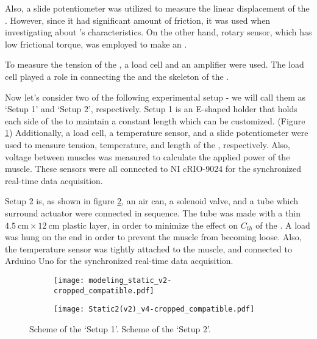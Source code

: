Also, a slide potentiometer was utilized to measure the linear displacement of the \scpsnospace. However, since it had significant amount of friction, it was used when investigating about \scpnospace's characteristics. On the other hand, rotary sensor, which has low frictional torque, was employed to make an \antanospace. 

To measure the tension of the \scpsnospace, a load cell and an amplifier were used.
The load cell played a role in connecting the \scps and the skeleton of the \antanospace.



Now let's consider two of the following experimental setup - we will call them as `Setup 1' and `Setup 2', respectively. Setup 1 is 
%
an E-shaped holder that holds each side of the \scp to maintain a constant length which can be customized. (Figure \ref{static_sch}) Additionally, a load cell, a temperature sensor, and a slide potentiometer were used to measure tension, temperature, and length of the \scpnospace, respectively. Also, voltage between muscles was measured to calculate the applied power of the muscle. These sensors were all connected to NI cRIO-9024 for the synchronized real-time data acquisition.

Setup 2 is, 
%
as shown in figure \ref{dynamic_sch}, an air can, a solenoid valve, and a tube which surround actuator were connected in sequence. 
The tube was made with a thin $\SI{4.5}{\centi\meter} \times \SI{12}{\centi\meter}$ plastic layer, in order to minimize the effect on $C_{th}$ of the \scpnospace.
A load was hung on the end in order to prevent the muscle from becoming loose. 
Also, the temperature sensor was tightly attached to the muscle, and connected to Arduino Uno for the synchronized real-time data acquisition.


\begin{figure}[t]
	\centering
	\begin{subfigure}[t]{0.22\textwidth}
		\centering\texttt{[image: modeling\_static\_v2-cropped\_compatible.pdf]}
		\caption{\label{static_sch}}
	\end{subfigure}
	\begin{subfigure}[t]{0.22\textwidth}
		\centering\texttt{[image: Static2(v2)\_v4-cropped\_compatible.pdf]} %
		\caption{\label{dynamic_sch}}
	\end{subfigure}
	\caption[Scheme of two experimental setups]{ Scheme of the `Setup 1'.  Scheme of the `Setup 2'.}
	\label{exp_sch}
\end{figure}



